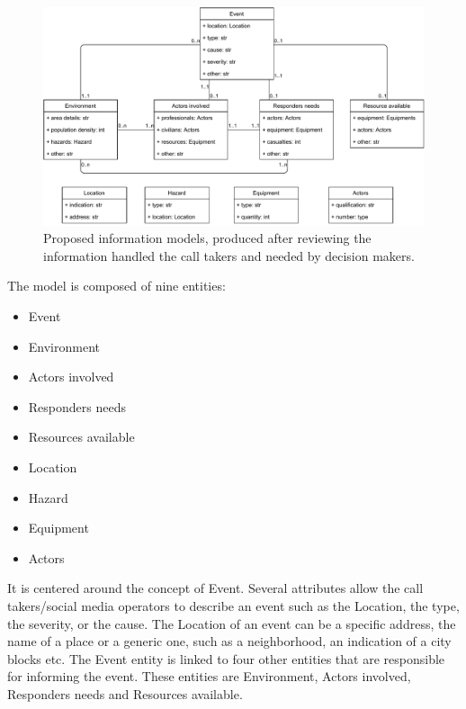 \begin{figure}
    \centering
    \includegraphics[width=\textwidth]{figures/chap-3/information-needs.pdf}
    \caption{Proposed information models, produced after reviewing the information handled the call takers and needed by decision makers.}
    \label{information:information-models}
\end{figure}

The model is composed of nine entities:
\begin{itemize}
    \item Event
    \item Environment
    \item Actors involved
    \item Responders needs
    \item Resources available
    \item Location
    \item Hazard
    \item Equipment
    \item Actors
\end{itemize}

It is centered around the concept of Event.
Several attributes allow the call takers/social media operators to describe an event such as
the Location, the type, the severity, or the cause.
The Location of an event can be a specific address, the name of a place or a generic one,
such as a neighborhood, an indication of a city blocks etc.
The Event entity is linked to four other entities that are responsible for informing the event.
These entities are Environment, Actors involved, Responders needs and Resources available.

